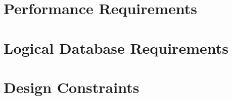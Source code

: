 \documentclass{scrreprt}
\begin{document}
\section{Performance Requirements}
\section{Logical Database Requirements}


\section{Design Constraints}
\end{document}
